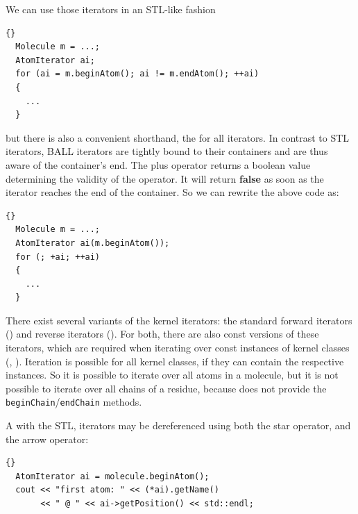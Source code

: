 We can use those iterators in an STL-like fashion
\\
\begin{lstlisting}{}
  Molecule m = ...;
  AtomIterator ai;
  for (ai = m.beginAtom(); ai != m.endAtom(); ++ai)
  {
    ...
  }
\end{lstlisting}
\noindent but there is also a convenient shorthand, the 
for all iterators. In contrast to STL iterators, BALL iterators are tightly 
bound to their containers and are thus aware of the container's end.
The plus operator returns a boolean value determining the validity of the
operator. It will return {\bf false} as soon as the iterator reaches the
end of the container. So we can rewrite the above code as:
\\
\begin{lstlisting}{}
  Molecule m = ...;
  AtomIterator ai(m.beginAtom());
  for (; +ai; ++ai)
  {
    ...
  }
\end{lstlisting}

\noindent 
There exist several variants of the kernel iterators: the standard
forward iterators (\eg {}) and reverse iterators
(). For both, there are also const versions of
these iterators, which are required when iterating over const instances of
kernel classes (, ).
Iteration is possible for all kernel classes, if they can contain the
respective instances. So it is possible to iterate over all atoms in a
molecule, but it is not possible to iterate over all chains of a residue,
because  does not provide the {\tt beginChain}/{\tt endChain}
methods.

A with the STL, iterators may be dereferenced using both the star operator, and
the arrow operator:\\
\begin{lstlisting}{}
  AtomIterator ai = molecule.beginAtom();
  cout << "first atom: " << (*ai).getName() 
       << " @ " << ai->getPosition() << std::endl;
\end{lstlisting}




